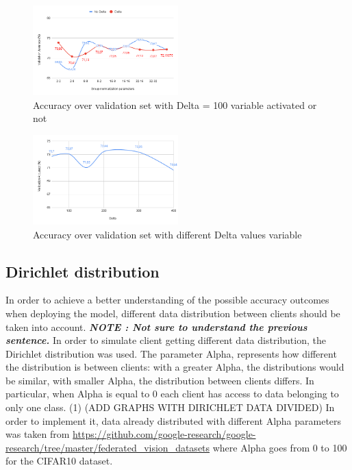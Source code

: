 \documentclass[twocolumn]{article}
\begin{document}

\begin{figure}
    \centering
    \includegraphics[width=0.5\textwidth,height=.3\textheight]{groupnormalizationDeltaNoDelta.png}
    \caption{Accuracy over validation set with Delta = 100 variable activated or not}
     \label{AccDiff} 
\end{figure}

\begin{figure}
    \centering
    \includegraphics[width=0.5\textwidth,height=.3\textheight]{deltacomparison.png}
    \caption{Accuracy over validation set with different Delta values variable}
     \label{DeltaValues} 
\end{figure}

\subsection{Dirichlet distribution}

In order to achieve a better understanding of the possible accuracy outcomes when deploying the model, different data distribution between clients should be taken into account. \textbf{\emph{NOTE : Not sure to understand the previous sentence.}} In order to simulate client getting different data distribution, the Dirichlet distribution was used. The parameter Alpha, represents how different the distribution is between clients: with a greater Alpha, the distributions 
would be similar, with smaller Alpha, the distribution between clients differs.
In particular, when Alpha is equal to 0 each client has access to data belonging to only one class.
(1)
(ADD GRAPHS WITH DIRICHLET DATA DIVIDED)
In order to implement it, data already distributed with different Alpha parameters was taken from \url{https://github.com/google-research/google-research/tree/master/federated_vision_datasets} where Alpha goes from 0 to 100 for the CIFAR10 dataset.
\end{document}
